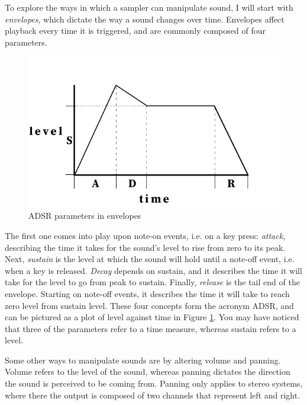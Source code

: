\documentclass[12pt, a4paper, hidelinks]{article}
\begin{document}
	To explore the ways in which a sampler can manipulate sound, I will start with \textit{envelopes}, which dictate the way a sound changes over time. Envelopes affect playback every time it is triggered, and are commonly composed of four parameters. 	
	\begin{figure}
		\centering
		\vspace{-33pt}
		\includegraphics[scale=0.4]{envelope.png}
		\caption{ADSR parameters in envelopes}
		\label{fig:envelope}
	\end{figure}
	The first one  comes into play upon note-on events, i.e. on a key press: \textit{attack}, describing the time it takes for the sound's level to rise from zero to its peak. Next, \textit{sustain} is the level at which the sound will hold until a note-off event, i.e. when a key is released. \textit{Decay} depends on sustain, and it describes the time it will take for the level to go from peak to sustain. Finally, \textit{release} is the tail end of the envelope. Starting on note-off events, it describes the time it will take to reach zero level from sustain level. These four concepts form the acronym ADSR, and can be pictured as a plot of level against time in Figure \ref{fig:envelope}. You may have noticed that three of the parameters refer to a time measure, whereas sustain refers to a level. \par 
	
	Some other ways to manipulate sounds are by altering volume and panning. Volume refers to the level of the sound, whereas panning dictates the direction the sound is perceived to be coming from. Panning only applies to stereo systems, where there the output is composed of two channels that represent left and right. 
	
	
	\newpage
\end{document}
